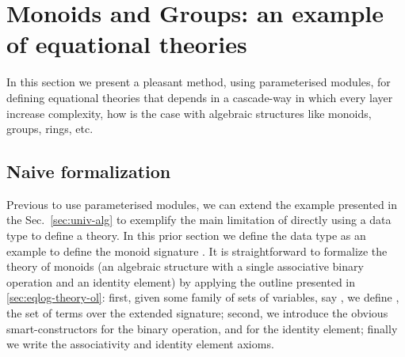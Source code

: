 \section{Monoids and Groups: an example of equational theories}
\label{sec:extheories}

In this section we present a pleasant method, using parameterised modules, for
defining equational theories that depends in a cascade-way in which every layer
increase complexity, how is the case with algebraic structures like monoids,
groups, rings, etc.

\subsection{Naive formalization}

Previous to use parameterised modules, we can extend the example presented in
the Sec.~\ref{sec:univ-alg} to exemplify the main limitation of directly using a
data type to define a theory. In this prior section we define the data type
 as an example to define the monoid signature
. It is straightforward to formalize the theory of
monoids (\ie an algebraic structure with a single associative binary operation
and an identity element) by applying the outline presented in
\ref{sec:eqlog-theory-ol}: first, given some family of sets of variables, say
\AgdaSpace{} \AgdaSymbol{:}\AgdaSpace{} 
, we define \AgdaSpace{}
\AgdaSymbol{=}\AgdaSpace{}  \AgdaSpace{}
\AgdaSpace{}
, the set of terms over the
extended signature; second, we introduce the obvious smart-constructors
\AgdaUnderscore{}\AgdaUnderscore{} for the
binary operation, and  for the identity element; finally we
write the associativity and identity element axioms.

